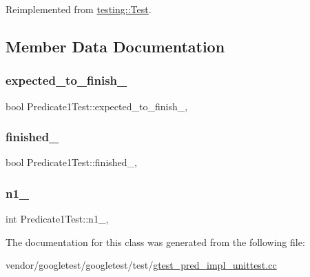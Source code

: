 Reimplemented from \hyperlink{classtesting_1_1_test_a5f0ab439802cbe0ef7552f1a9f791923}{testing\+::\+Test}.



\subsection{Member Data Documentation}
\mbox{\label{class_predicate1_test_ad91cfa58e6352d53abacce32df2ef635}} 
\subsubsection{\texorpdfstring{expected\+\_\+to\+\_\+finish\+\_\+}{expected\_to\_finish\_}}
{\footnotesize\ttfamily bool Predicate1\+Test\+::expected\+\_\+to\+\_\+finish\+\_\+\hspace{0.3cm}{\ttfamily [static]}, {\ttfamily [protected]}}

\mbox{\label{class_predicate1_test_a6d45fb2d1f01a5c8baf28f60039c244e}} 
\subsubsection{\texorpdfstring{finished\+\_\+}{finished\_}}
{\footnotesize\ttfamily bool Predicate1\+Test\+::finished\+\_\+\hspace{0.3cm}{\ttfamily [static]}, {\ttfamily [protected]}}

\mbox{\label{class_predicate1_test_a528d9f7f618b17802962a3824eea11e3}} 
\subsubsection{\texorpdfstring{n1\+\_\+}{n1\_}}
{\footnotesize\ttfamily int Predicate1\+Test\+::n1\+\_\+\hspace{0.3cm}{\ttfamily [static]}, {\ttfamily [protected]}}



The documentation for this class was generated from the following file\+:\begin{DoxyCompactItemize}
\item 
vendor/googletest/googletest/test/\hyperlink{gtest__pred__impl__unittest_8cc}{gtest\+\_\+pred\+\_\+impl\+\_\+unittest.\+cc}\end{DoxyCompactItemize}

